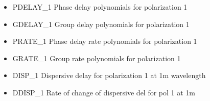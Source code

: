 \documentclass[letterpaper,10pt,english]{sphinxmanual}
\begin{document}
\begin{fulllineitems}
\begin{itemize}
\item {} 
PDELAY\_1      Phase delay polynomials for polarization 1

\item {} 
GDELAY\_1      Group delay polynomials for polarization 1

\item {} 
PRATE\_1       Phase delay rate polynomials for polarization 1

\item {} 
GRATE\_1       Group rate polynomials for polarization 1

\item {} 
DISP\_1        Dispersive delay for polarization 1 at 1m wavelength

\item {} 
DDISP\_1       Rate of change of dispersive del for pol 1 at 1m

\end{itemize}

\end{fulllineitems}


\end{document}
